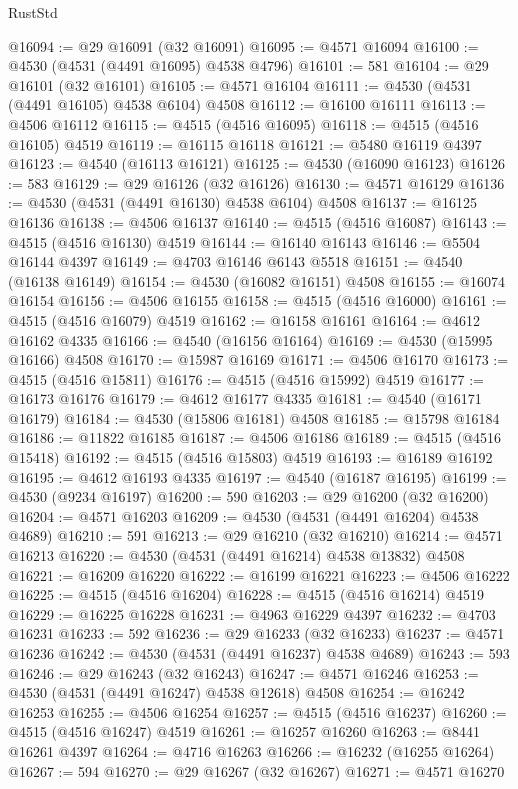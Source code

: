 \begin{lexlean}{RustStd}
\begin{coremodule}
{\begin{coremodule}
{{{{{{{{{{{{{{{{{{{{{{{{{{{{{{{{{{{{{{{{{{{{{{{{{{{{{{{@16094 := @29 @16091 (@32 @16091)
@16095 := @4571 @16094
@16100 := @4530 (@4531 (@4491 @16095) @4538 @4796)
@16101 := 581
@16104 := @29 @16101 (@32 @16101)
@16105 := @4571 @16104
@16111 := @4530 (@4531 (@4491 @16105) @4538 @6104) @4508
@16112 := @16100 @16111
@16113 := @4506 @16112
@16115 := @4515 (@4516 @16095)
@16118 := @4515 (@4516 @16105) @4519
@16119 := @16115 @16118
@16121 := @5480 @16119 @4397
@16123 := @4540 (@16113 @16121)
@16125 := @4530 (@16090 @16123)
@16126 := 583
@16129 := @29 @16126 (@32 @16126)
@16130 := @4571 @16129
@16136 := @4530 (@4531 (@4491 @16130) @4538 @6104) @4508
@16137 := @16125 @16136
@16138 := @4506 @16137
@16140 := @4515 (@4516 @16087)
@16143 := @4515 (@4516 @16130) @4519
@16144 := @16140 @16143
@16146 := @5504 @16144 @4397
@16149 := @4703 @16146 @6143 @5518
@16151 := @4540 (@16138 @16149)
@16154 := @4530 (@16082 @16151) @4508
@16155 := @16074 @16154
@16156 := @4506 @16155
@16158 := @4515 (@4516 @16000)
@16161 := @4515 (@4516 @16079) @4519
@16162 := @16158 @16161
@16164 := @4612 @16162 @4335
@16166 := @4540 (@16156 @16164)
@16169 := @4530 (@15995 @16166) @4508
@16170 := @15987 @16169
@16171 := @4506 @16170
@16173 := @4515 (@4516 @15811)
@16176 := @4515 (@4516 @15992) @4519
@16177 := @16173 @16176
@16179 := @4612 @16177 @4335
@16181 := @4540 (@16171 @16179)
@16184 := @4530 (@15806 @16181) @4508
@16185 := @15798 @16184
@16186 := @11822 @16185
@16187 := @4506 @16186
@16189 := @4515 (@4516 @15418)
@16192 := @4515 (@4516 @15803) @4519
@16193 := @16189 @16192
@16195 := @4612 @16193 @4335
@16197 := @4540 (@16187 @16195)
@16199 := @4530 (@9234 @16197)
@16200 := 590
@16203 := @29 @16200 (@32 @16200)
@16204 := @4571 @16203
@16209 := @4530 (@4531 (@4491 @16204) @4538 @4689)
@16210 := 591
@16213 := @29 @16210 (@32 @16210)
@16214 := @4571 @16213
@16220 := @4530 (@4531 (@4491 @16214) @4538 @13832) @4508
@16221 := @16209 @16220
@16222 := @16199 @16221
@16223 := @4506 @16222
@16225 := @4515 (@4516 @16204)
@16228 := @4515 (@4516 @16214) @4519
@16229 := @16225 @16228
@16231 := @4963 @16229 @4397
@16232 := @4703 @16231
@16233 := 592
@16236 := @29 @16233 (@32 @16233)
@16237 := @4571 @16236
@16242 := @4530 (@4531 (@4491 @16237) @4538 @4689)
@16243 := 593
@16246 := @29 @16243 (@32 @16243)
@16247 := @4571 @16246
@16253 := @4530 (@4531 (@4491 @16247) @4538 @12618) @4508
@16254 := @16242 @16253
@16255 := @4506 @16254
@16257 := @4515 (@4516 @16237)
@16260 := @4515 (@4516 @16247) @4519
@16261 := @16257 @16260
@16263 := @8441 @16261 @4397
@16264 := @4716 @16263
@16266 := @16232 (@16255 @16264)
@16267 := 594
@16270 := @29 @16267 (@32 @16267)
@16271 := @4571 @16270
}}}}}}}}}}}}}}}}}}}}}}}}}}}}}}}}}}}}}}}}}}}}}}}}}}}}}}}
\end{coremodule}}
\end{coremodule}
\end{lexlean}
